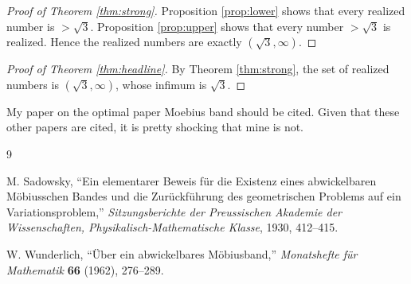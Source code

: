 \documentclass[12pt]{article}
\theoremstyle{plain}
\newcommand{\review}[1]{\begin{reviewbox}#1\end{reviewbox}}
\begin{document}
\begin{proof}[Proof of Theorem \ref{thm:strong}]
Proposition \ref{prop:lower} shows that every realized number is \(>\sqrt3\).
Proposition \ref{prop:upper} shows that every number \(>\sqrt3\) is realized.
Hence the realized numbers are exactly \((\sqrt3,\infty)\).
\end{proof}

\begin{proof}[Proof of Theorem \ref{thm:headline}]
By Theorem \ref{thm:strong}, the set of realized numbers is
\((\sqrt3,\infty)\), whose infimum is \(\sqrt3\).
\end{proof}

\review{My paper on the optimal paper Moebius band should be cited. Given that these other papers are cited, it is pretty shocking that mine is not.}

\begin{thebibliography}{9}

M. Sadowsky,
``Ein elementarer Beweis f\"ur die Existenz eines abwickelbaren M\"obiusschen
Bandes und die Zur\"uckf\"uhrung des geometrischen Problems auf ein
Variationsproblem,''
\emph{Sitzungsberichte der Preussischen Akademie der Wissenschaften,
Physikalisch-Mathematische Klasse},
1930, 412--415.

W. Wunderlich,
``\"Uber ein abwickelbares M\"obiusband,''
\emph{Monatshefte f\"ur Mathematik} \textbf{66} (1962), 276--289.

\end{thebibliography}
\end{document}
